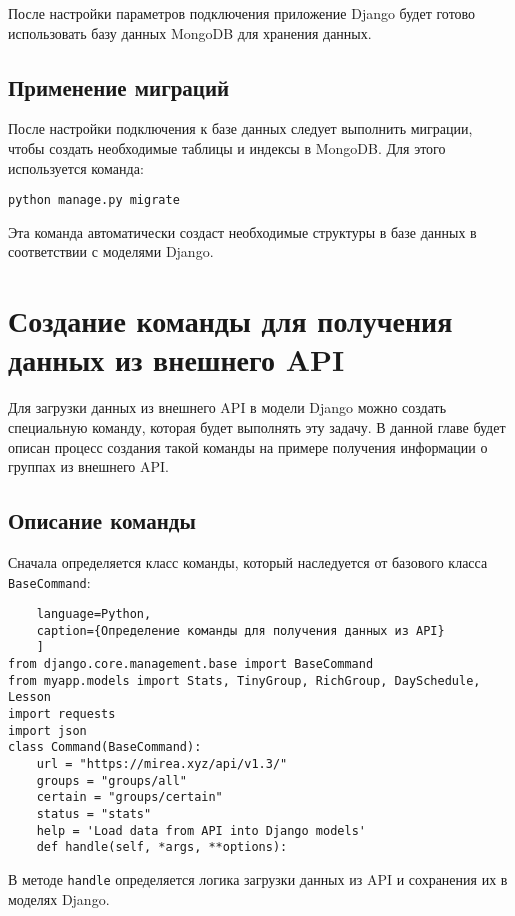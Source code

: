 После настройки параметров подключения приложение Django
будет готово использовать базу данных MongoDB для хранения данных.

\subsection{Применение миграций}

После настройки подключения к базе данных следует выполнить миграции, чтобы создать необходимые таблицы и индексы в MongoDB. Для этого используется команда:

\begin{verbatim}
python manage.py migrate
\end{verbatim}

Эта команда автоматически создаст необходимые структуры в базе данных в соответствии с моделями Django.

\section{Создание команды для получения данных из внешнего API}

Для загрузки данных из внешнего API в модели Django можно создать
специальную команду, которая будет выполнять эту задачу.
В данной главе будет описан процесс создания такой команды
на примере получения информации о группах из внешнего API.

\subsection{Описание команды}

Сначала определяется класс команды,
который наследуется от базового класса \texttt{BaseCommand}:

\begin{lstlisting}
	language=Python,
	caption={Определение команды для получения данных из API}
	]
from django.core.management.base import BaseCommand
from myapp.models import Stats, TinyGroup, RichGroup, DaySchedule, Lesson
import requests
import json
class Command(BaseCommand):
    url = "https://mirea.xyz/api/v1.3/"
    groups = "groups/all"
    certain = "groups/certain"
    status = "stats"
    help = 'Load data from API into Django models'
    def handle(self, *args, **options):
\end{lstlisting}

В методе \texttt{handle} определяется логика загрузки данных
из API и сохранения их в моделях Django.

